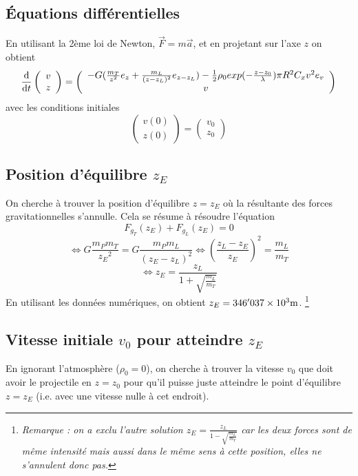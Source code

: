 \documentclass[a4paper,12pt,twoside]{article}
\def \be {\begin{equation}}
\def \ee {\end{equation}}
\def \dd  {{\rm d}}
\begin{document}
\subsection{Équations différentielles}
En utilisant la 2ème loi de Newton, $\vec{F}=m \vec{a}$, et en projetant sur l'axe $z$ on obtient 
\be
\frac{\dd }{\dd t} 
\left( \begin{array}{c} v \\ z \end{array} \right)
=
\left( \begin{array}{c}
    -G(\frac{m_T}{z^2}e_z+\frac{m_L}{(z-z_L)^2}e_{z-z_L}) - \frac{1}{2} \rho_0 exp{(-\frac{z-z_0}{\lambda})} \pi R^2 C_x v^2  e_v\\
     v
\end{array} \right)
\ee
avec les conditions initiales 
\be 
\left( \begin{array}{c} v(0) \\ z(0) \end{array} \right) 
=
\left( \begin{array}{c} v_0 \\ z_0 \end{array} \right)
\ee


\subsection{Position d'équilibre $z_E$}
On cherche à trouver la position d'équilibre $z=z_E$ où la résultante des forces gravitationnelles s'annulle.
Cela se résume à résoudre l'équation 
\[ F_{g_T}(z_E)+F_{g_L}(z_E)=0 \]
\[ \Leftrightarrow G\frac{m_Pm_T}{{z_E}^2}=G\frac{m_Pm_L}{(z_E-z_L)^2}  \Leftrightarrow (\frac{z_L-z_E}{z_E})^2=\frac{m_L}{m_T} \]
\be \Leftrightarrow z_E=\frac{z_L}{1+\sqrt{\frac{m_L}{m_T}}} \ee
En utilisant les données numériques, on obtient $z_E=346'037 \times 10^3  \rm m$.
\footnote{\textit{Remarque : on a exclu l'autre solution $z_E=\frac{z_L}{1-\sqrt{\frac{m_L}{m_T}}}$ car les deux forces sont de même intensité mais aussi dans le même sens à cette position, elles ne s'annulent donc pas.}}



\subsection{Vitesse initiale $v_0$ pour atteindre $z_E$}
En ignorant l'atmosphère ($\rho_0=0$), on cherche à trouver la vitesse $v_0$ que doit avoir le projectile en $z=z_0$ pour qu'il puisse juste atteindre le point d'équilibre $z=z_E$ (i.e. avec une vitesse nulle à cet endroit).
\end{document}
